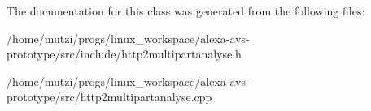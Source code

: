The documentation for this class was generated from the following files\+:\begin{DoxyCompactItemize}
\item 
/home/mutzi/progs/linux\+\_\+workspace/alexa-\/avs-\/prototype/src/include/http2multipartanalyse.\+h\item 
/home/mutzi/progs/linux\+\_\+workspace/alexa-\/avs-\/prototype/src/http2multipartanalyse.\+cpp\end{DoxyCompactItemize}
